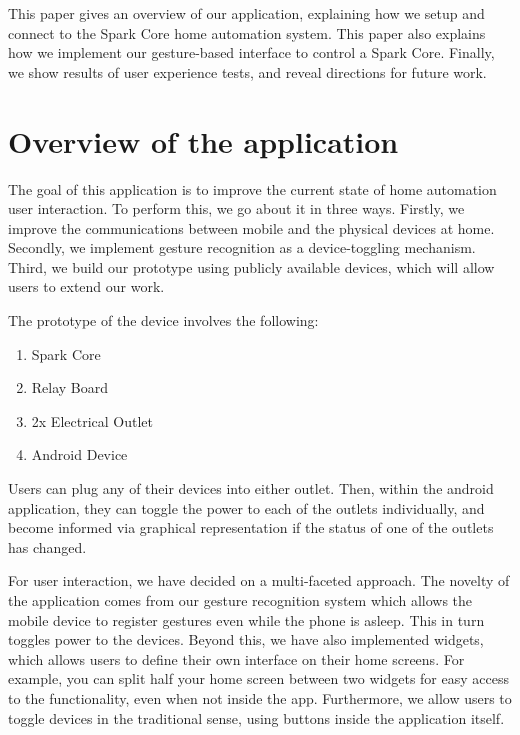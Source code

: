 \documentclass[journal]{IEEEtran}
\begin{document}
This paper gives an overview of our application, explaining how we setup and connect to the Spark Core\cite{sparkio} home automation system. This paper also explains how we implement our gesture-based interface to control a Spark Core. Finally, we  show results of user experience tests, and reveal directions for future work.
	
\section{Overview of the application}
The goal of this application is to improve the current state of home automation user interaction. To perform this, we go about it in three ways. Firstly, we improve the communications between mobile and the physical devices at home. Secondly, we implement gesture recognition as a device-toggling mechanism. Third, we build our prototype using publicly available devices, which will allow users to extend our work.  

The prototype of the device involves the following:
\begin{enumerate}
	\item Spark Core
	\item Relay Board
	\item 2x Electrical Outlet
	\item Android Device
\end{enumerate}

Users can plug any of their devices into either outlet. Then, within the android application, they can toggle the power to each of the outlets individually, and become informed via graphical representation if the status of one of the outlets has changed.

For user interaction, we have decided on a multi-faceted approach. The novelty of the application comes from our gesture recognition system which allows the mobile device to register gestures even while the phone is asleep. This in turn toggles power to the devices.  Beyond this, we have also implemented widgets, which allows users to define their own interface on their home screens. For example, you can split half your home screen between two widgets for easy access to the functionality, even when not inside the app. Furthermore, we allow users to toggle devices in the traditional sense, using buttons inside the application itself. 
\end{document}
